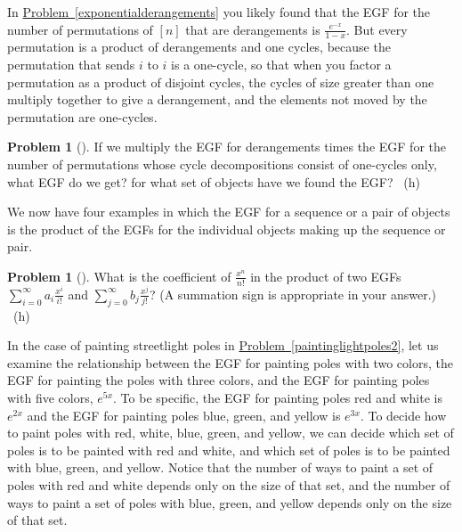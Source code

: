 \documentclass[10pt,]{book}
\theoremstyle{plain}
\theoremstyle{definition}
\newtheorem{activity}[project]{Problem}
\theoremstyle{definition}
\numberwithin{equation}{chapter}
\begin{document}
\hypertarget{p-2104}{}%
In \hyperref[exponentialderangements]{Problem~\ref{exponentialderangements}} you likely found that the EGF for the number of permutations of \([n]\) that are derangements is \(\frac{e^{-x}}{1-x}\). But every permutation is a product of derangements and one cycles, because the permutation that sends \(i\) to \(i\) is a one-cycle, so that when you factor a permutation as a product of disjoint cycles, the cycles of size greater than one multiply together to give a derangement, and the elements not moved by the permutation are one-cycles.%
\begin{activity}[] \label{derangementsand1cycles}
\hypertarget{p-2105}{}%
If we multiply the EGF for derangements times the EGF for the number of permutations whose cycle decompositions consist of one-cycles only, what EGF do we get? for what set of objects have we found the EGF?%
~{\tiny (h)}\end{activity}
\hypertarget{p-2108}{}%
We now have four examples in which the EGF for a sequence or a pair of objects is the product of the EGFs for the individual objects making up the sequence or pair.%
\begin{activity}[] \label{exponentialpp1}
\hypertarget{p-2109}{}%
What is the coefficient of \(\frac{x^n}{n!}\) in the product of two EGFs \(\sum_{i=0}^\infty a_i\frac{x^i}{i!}\) and \(\sum_{j=0}^\infty
b_j\frac{x^j}{j!}\)? (A summation sign is appropriate in your answer.)%
~{\tiny (h)}\end{activity}
\hypertarget{p-2112}{}%
 In the case of painting streetlight poles in \hyperref[paintinglightpoles2]{Problem~\ref{paintinglightpoles2}}, let us examine the relationship between the EGF for painting poles with two colors, the EGF for painting the poles with three colors, and the EGF for painting poles with five colors, \(e^{5x}\). To be specific, the EGF for painting poles red and white is \(e^{2x}\) and the EGF for painting poles blue, green, and yellow is \(e^{3x}\). To decide how to paint poles with red, white, blue, green, and yellow, we can decide  which set of poles is to be painted with red and white, and which set of poles is to be painted with blue, green, and yellow. Notice that the number of ways to paint a set of poles with red and white depends only on the size of that set, and the number of ways to paint a set of poles with blue, green, and yellow depends only on the size of that set.%
\end{document}
